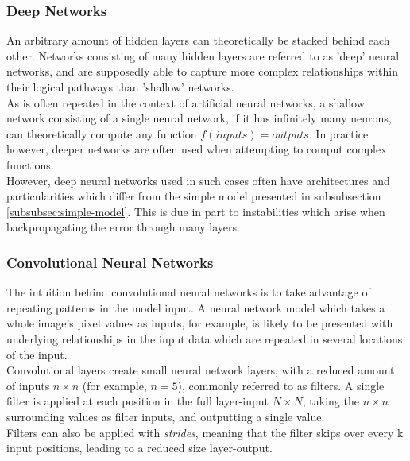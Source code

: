 \subsubsection{Deep Networks}

An arbitrary amount of hidden layers can theoretically be stacked behind each other. Networks consisting of many hidden layers are referred to as 'deep' neural networks, and are supposedly able to capture more complex relationships within their logical pathways than 'shallow' networks.\\

As is often repeated in the context of artificial neural networks, a shallow network consisting of a single neural network, if it has infinitely many neurons, can theoretically compute any function $f(inputs) = outputs$. In practice however, deeper networks are often used when attempting to comput complex functions.\\

However, deep neural networks used in such cases often have architectures and particularities which differ from the simple model presented in subsubsection \ref{subsubsec:simple-model}. This is due in part to instabilities which arise when backpropagating the error through many layers.\\ 

\subsubsection{Convolutional Neural Networks}

The intuition behind convolutional neural networks is to take advantage of repeating patterns in the model input. A neural network model which takes a whole image's pixel values as inputs, for example, is likely to be presented with underlying relationships in the input data which are repeated in several locations of the input.\\

Convolutional layers create small neural network layers, with a reduced amount of inputs $n\times n$ (for example, $n = 5$), commonly referred to as filters. A single filter is applied at each position in the full layer-input $N\times N$, taking the $n\times n$ surrounding values as filter inputs, and outputting a single value.\\

Filters can also be applied with \textit{strides}, meaning that the filter skips over every k input positions, leading to a reduced size layer-output.\\

